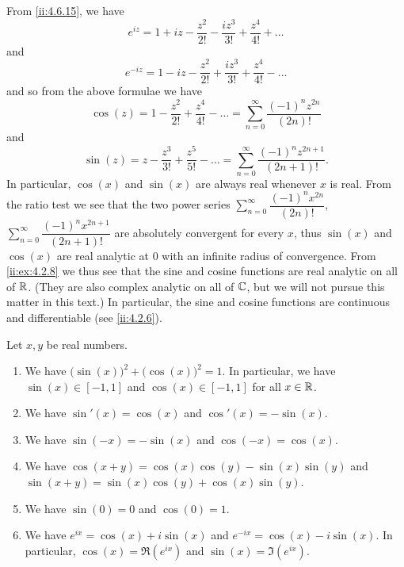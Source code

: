 \begin{ac}\label{ii:ac:4.7.1}
  From \cref{ii:4.6.15}, we have
  \[
    e^{i z} = 1 + i z - \dfrac{z^2}{2!} - \dfrac{i z^3}{3!} + \dfrac{z^4}{4!} + \dots
  \]
  and
  \[
    e^{- i z} = 1 - i z - \dfrac{z^2}{2!} + \dfrac{i z^3}{3!} + \dfrac{z^4}{4!} - \dots
  \]
  and so from the above formulae we have
  \[
    \cos(z) = 1 - \dfrac{z^2}{2!} + \dfrac{z^4}{4!} - \dots = \sum_{n = 0}^\infty \dfrac{(-1)^n z^{2n}}{(2n)!}
  \]
  and
  \[
    \sin(z) = z - \dfrac{z^3}{3!} + \dfrac{z^5}{5!} - \dots = \sum_{n = 0}^\infty \dfrac{(-1)^n z^{2n + 1}}{(2n + 1)!}.
  \]
  In particular, \(\cos(x)\) and \(\sin(x)\) are always real whenever \(x\) is real.
  From the ratio test we see that the two power series \(\sum_{n = 0}^\infty \dfrac{(-1)^n x^{2n}}{(2n)!}\), \(\sum_{n = 0}^\infty \dfrac{(-1)^n x^{2n + 1}}{(2n + 1)!}\) are absolutely convergent for every \(x\), thus \(\sin(x)\) and \(\cos(x)\) are real analytic at \(0\) with an infinite radius of convergence.
  From \cref{ii:ex:4.2.8} we thus see that the sine and cosine functions are real analytic on all of \(\mathbb{R}\).
  (They are also complex analytic on all of \(\mathbb{C}\), but we will not pursue this matter in this text.)
  In particular, the sine and cosine functions are continuous and differentiable (see \cref{ii:4.2.6}).
\end{ac}

\begin{thm}\label{ii:4.7.2}
  Let \(x, y\) be real numbers.
  \begin{enumerate}
    \item We have \(\big(\sin(x)\big)^2 + \big(\cos(x)\big)^2 = 1\).
          In particular, we have \(\sin(x) \in [-1, 1]\) and \(\cos(x) \in [-1, 1]\) for all \(x \in \mathbb{R}\).
    \item We have \(\sin'(x) = \cos(x)\) and \(\cos'(x) = -\sin(x)\).
    \item We have \(\sin(-x) = -\sin(x)\) and \(\cos(-x) = \cos(x)\).
    \item We have \(\cos(x + y) = \cos(x) \cos(y) - \sin(x) \sin(y)\) and \(\sin(x + y) = \sin(x) \cos(y) + \cos(x) \sin(y)\).
    \item We have \(\sin(0) = 0\) and \(\cos(0) = 1\).
    \item We have \(e^{i x} = \cos(x) + i \sin(x)\) and \(e^{- i x} = \cos(x) - i \sin(x)\).
          In particular, \(\cos(x) = \Re(e^{i x})\) and \(\sin(x) = \Im(e^{i x})\).
  \end{enumerate}
\end{thm}

